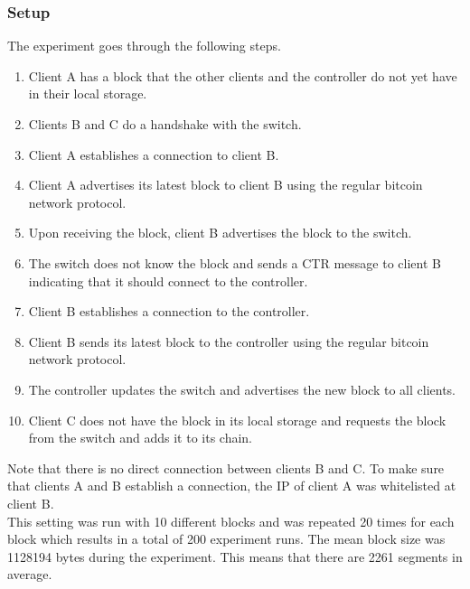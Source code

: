 \subsubsection{Setup}
The experiment goes through the following steps.
\begin{enumerate}
	\item Client A has a block that the other clients and the controller do not yet have in their local storage.
	\item Clients B and C do a handshake with the switch.
	\item Client A establishes a connection to client B.
	\item Client A advertises its latest block to client B using the regular bitcoin network protocol.
	\item Upon receiving the block, client B advertises the block to the switch.
	\item The switch does not know the block and sends a CTR message to client B indicating that it should connect to the controller.
	\item Client B establishes a connection to the controller.
	\item Client B sends its latest block to the controller using the regular bitcoin network protocol.
	\item The controller updates the switch and advertises the new block to all clients.
	\item Client C does not have the block in its local storage and requests the block from the switch and adds it to its chain.
\end{enumerate}
Note that there is no direct connection between clients B and C. To make sure that clients A and B establish a connection, the IP of client A was whitelisted at client B.\\
This setting was run with 10 different blocks and was repeated 20 times for each block which results in a total of 200 experiment runs. The mean block size was 1128194 bytes during the experiment. This means that there are 2261 segments in average.\\
